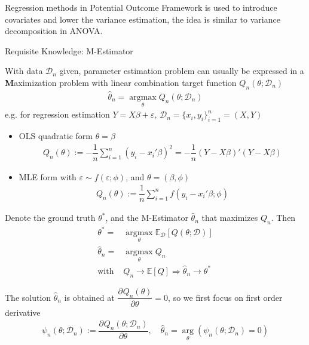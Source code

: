 Regression methods in Potential Outcome Framework is used to introduce covariates and lower the variance estimation, the idea is similar to variance decomposition in ANOVA.

\begin{point}
    Requisite Knowledge: M-Estimator
\end{point}

With data $ \mathcal{D}_n $ given, parameter estimation problem can usually be expressed in a \textbf{M}aximization problem with linear combination target function $ Q_n(\theta ;\mathcal{D}_n) $ 
\begin{align}
    \hat{\theta }_n=\mathop{\arg\max}\limits_{\theta } Q_n(\theta;\mathcal{D}_n )
\end{align}
e.g. for regression estimation $ Y=X\beta + \varepsilon  $, $ \mathcal{D}_n=\{x_i,y_i\}_{i=1}^n=(X,Y) $
\begin{itemize}[topsep=2pt,itemsep=0pt]
    \item OLS quadratic form $ \theta = \beta $ 
    \begin{align}
        Q_n(\theta ) := -\dfrac{1}{n}\sum_{i=1}^n\left(y_i-x_i'\beta \right)^2=-\dfrac{1}{n}(Y-X\beta )'(Y-X\beta )
    \end{align}
    \item MLE form with $ \varepsilon \sim f(\varepsilon ; \phi ) $, and $ \theta =(\beta ,\phi ) $
    \begin{align}
        Q_n(\theta ) :=\dfrac{1}{n} \sum_{i=1}^nf\left(y_i-x_i'\beta ; \phi  \right)
    \end{align} 
\end{itemize}

    Denote the ground truth $ \theta ^* $, and the M-Estimator $ \hat{\theta }_n $ that maximizes $ Q_n $. Then
    \begin{align}
        \theta ^* =& \mathop{\arg\max}\limits_{\theta } \mathbb{E}_{\mathcal{D}}\left[ Q(\theta ; \mathcal{D}) \right]\\
        \hat{\theta }_n=&\mathop{\arg\max}\limits_{\theta } Q_n\\
        \text{with }&Q_n\to \mathbb{E}\left[ Q \right] \Rightarrow \hat{\theta }_n\to \theta ^*
    \end{align}

    The solution $ \hat{\theta }_n $ is obtained at $ \dfrac{\partial^{} Q_n(\theta )}{\partial \theta ^{}} =0$, so we first focus on first order derivative
    \begin{align}
        \psi_n(\theta;\mathcal{D}_n ) := \dfrac{\partial^{} Q_n(\theta;\mathcal{D}_n )}{\partial \theta ^{}},\quad \hat{\theta }_n=\mathop{\arg}\limits_{\theta }(\psi_n(\theta ;\mathcal{D}_n)=0 )
    \end{align}

